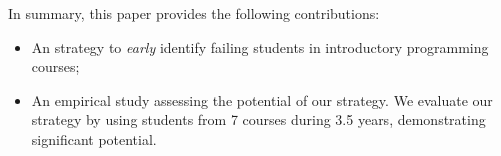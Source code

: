 In summary, this paper provides the following contributions:

\begin{itemize}

	\item An strategy to \textit{early} identify failing students in introductory programming courses;
	
	\item An empirical study assessing the potential of our strategy. We evaluate our strategy by using \totalStudents students from 7 courses during 3.5 years, demonstrating significant potential.

\end{itemize}